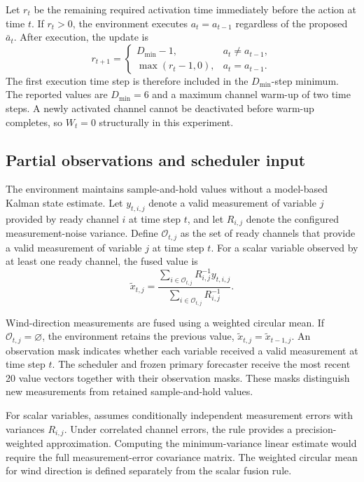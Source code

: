 Let $r_t$ be the remaining required activation time immediately before the action
at time $t$. If $r_t>0$, the environment executes $a_t=a_{t-1}$ regardless of
the proposed $\bar a_t$. After execution, the update is
\begin{equation}
  r_{t+1}=
  \begin{cases}
    D_{\min}-1, & a_t\neq a_{t-1},\\
    \max(r_t-1,0), & a_t=a_{t-1}.
  \end{cases}
  \label{eq:activation_timer_update}
\end{equation}
The first execution time step is therefore included in the $D_{\min}$-step
minimum. The reported values are $D_{\min}=6$ and a maximum channel warm-up of
two time steps. A newly activated channel cannot be deactivated before warm-up
completes, so $W_t=0$ structurally in this experiment.

\subsection{Partial observations and scheduler input}
\label{sec:partial_observation_update}

The environment maintains sample-and-hold values without a model-based Kalman
state estimate. Let $y_{t,i,j}$ denote a valid measurement of variable $j$
provided by ready channel $i$ at time step $t$, and let $R_{i,j}$ denote the
configured measurement-noise variance. Define $\mathcal{O}_{t,j}$ as the set
of ready channels that provide a valid measurement of variable $j$ at time
step $t$. For a scalar variable observed by at least one ready channel, the
fused value is
\begin{equation}
  \widetilde{x}_{t,j}
  =
  \frac{\sum_{i\in\mathcal{O}_{t,j}}R_{i,j}^{-1}y_{t,i,j}}
       {\sum_{i\in\mathcal{O}_{t,j}}R_{i,j}^{-1}} .
  \label{eq:observation_fusion}
\end{equation}

Wind-direction measurements are fused using a weighted circular mean. If
$\mathcal{O}_{t,j}=\varnothing$, the environment retains the previous value,
$\widetilde{x}_{t,j}=\widetilde{x}_{t-1,j}$. An observation mask indicates
whether each variable received a valid measurement at time step $t$. The
scheduler and frozen primary forecaster receive the most recent 20 value vectors
together with their observation masks. These masks distinguish new measurements
from retained sample-and-hold values.

For scalar variables,  assumes conditionally
independent measurement errors with variances $R_{i,j}$. Under correlated
channel errors, the rule provides a precision-weighted approximation. Computing
the minimum-variance linear estimate would require the full measurement-error
covariance matrix. The weighted circular mean for wind direction is defined
separately from the scalar fusion rule.

